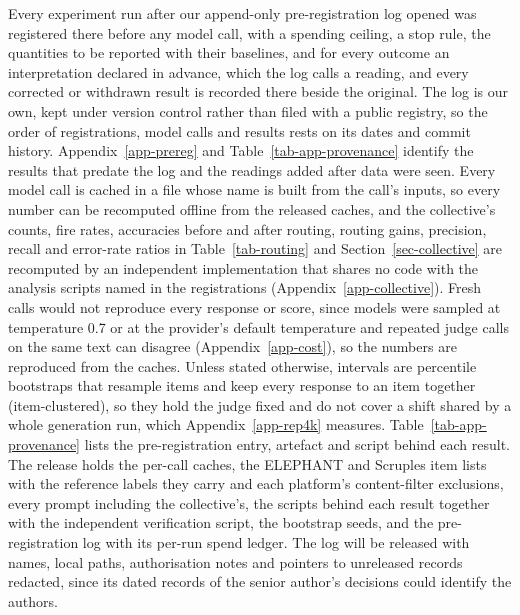 Every experiment run after our append-only pre-registration log opened was registered there
before any model call, with a spending ceiling, a stop rule, the quantities to be reported with
their baselines, and for every outcome an interpretation declared in advance, which the log calls
a reading, and every corrected or withdrawn result is recorded there beside the original.
The log is our own, kept under version control rather than filed with a public registry, so
the order of registrations, model calls and results rests on its dates and commit history.
Appendix~\ref{app-prereg} and Table~\ref{tab-app-provenance} identify the results that predate
the log and the readings added after data were seen.
Every model call is cached in a file whose name is built from the call's inputs, so every number
can be recomputed offline from the released caches, and the collective's counts, fire rates,
accuracies before and after routing, routing gains, precision, recall and error-rate ratios in
Table~\ref{tab-routing} and Section~\ref{sec-collective} are recomputed by an independent
implementation that shares no code with the analysis scripts named in the registrations
(Appendix~\ref{app-collective}).
Fresh calls would not reproduce every response or score, since models were sampled at temperature 0.7 or at
the provider's default temperature and repeated judge calls on the same text can disagree
(Appendix~\ref{app-cost}), so the numbers are reproduced from the caches.
Unless stated otherwise, intervals are percentile bootstraps that resample items and keep
every response to an item together (item-clustered), so they hold the judge fixed and do not
cover a shift shared by a whole generation run, which Appendix~\ref{app-rep4k} measures.
Table~\ref{tab-app-provenance} lists the pre-registration entry, artefact and script behind each result. The
release holds the per-call caches, the ELEPHANT and Scruples item lists with the reference labels
they carry and each platform's content-filter exclusions, every prompt including the collective's, the scripts
behind each result together with the independent verification script, the bootstrap seeds, and
the pre-registration log with its per-run spend ledger. The log will be released with names,
local paths, authorisation notes and pointers to unreleased
records redacted, since its dated records of the senior author's decisions could identify the
authors.
